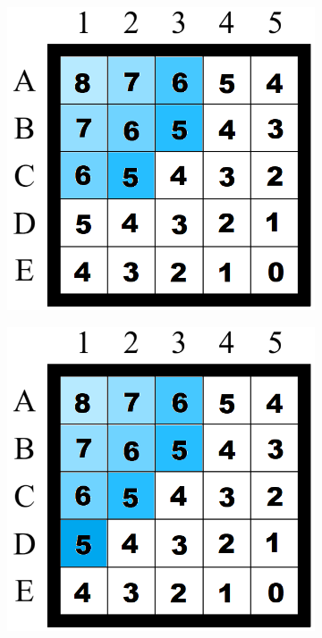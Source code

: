 \begin{figure}[H]
\begin{subfigure}[b]{.3\textwidth}
\end{subfigure}
\begin{subfigure}[b]{.3\textwidth}
  \centering
  \includegraphics[width=0.95\linewidth]{Report/Part2/g tie breaker/smaller g/5.png}  
\end{subfigure}
\begin{subfigure}[b]{.3\textwidth}
  \centering
  \includegraphics[width=0.95\linewidth]{Report/Part2/g tie breaker/smaller g/6.png}  

\end{subfigure}
\end{figure}
